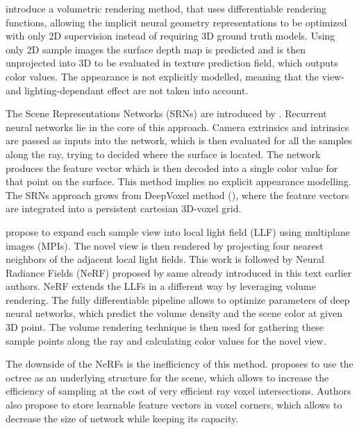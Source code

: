 \cite{niemeyer2020differentiable} introduce a volumetric rendering method,
that uses differentiable rendering functions,
allowing the implicit neural geometry representations to be optimized
with only 2D supervision instead of requiring 3D ground truth models.
Using only 2D sample images the surface depth map is predicted
and is then unprojected into 3D to be evaluated in texture prediction field,
which outputs color values.
The appearance is not explicitly modelled, meaning that the view- and lighting-dependant effect are not taken into account.


The Scene Representations Networks (SRNs) are introduced by \cite{sitzmann2019srns}.
Recurrent neural networks lie in the core of this approach.
Camera extrinsics and intrinsics are passed as inputs into the network,
which is then evaluated for all the samples along the ray,
trying to decided where the surface is located.
The network produces the feature vector which is then decoded into a single color value for that point on the surface.
This method implies no explicit appearance modelling.
The SRNs approach grows from DeepVoxel method (\cite{sitzmann2019deepvoxels}),
where the feature vectors are integrated into a persistent cartesian 3D-voxel grid.

\cite{mildenhall2019local} propose to expand each sample view into local light field (LLF) using multiplane images (MPIs).
The novel view is then rendered by projecting four nearest neighbors of the adjacent local light fields.
This work is followed by Neural Radiance Fields (NeRF) \cite{mildenhall2020nerf} proposed by same already introduced in this text earlier authors.
NeRF extends the LLFs in a different way by leveraging volume rendering.
The fully differentiable pipeline allows to optimize parameters of deep neural networks,
which predict the volume density and the scene color at given 3D point.
The volume rendering technique is then used for gathering these sample points along the ray
and calculating color values for the novel view.

The downside of the NeRFs is the inefficiency of this method.
\cite{liu2021neural} proposes to use the octree as an underlying structure for the scene,
which allows to increase the efficiency of sampling at the cost of very efficient ray voxel intersections.
Authors also propose to store learnable feature vectors in voxel corners,
which allows to decrease the size of network while keeping its capacity.

